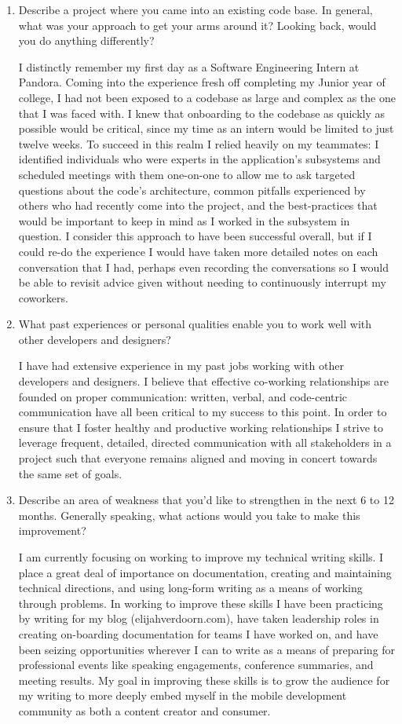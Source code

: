 \documentclass[9pt,letterpaper]{article}
\begin{document}
\begin{enumerate}
	\item Describe a project where you came into an existing code base. In general, what was your approach to get your arms around it? Looking back, would you do anything differently?

		I distinctly remember my first day as a Software Engineering Intern at Pandora. Coming into the experience fresh off completing my Junior year of college, I had not been exposed to a codebase as large and complex as the one that I was faced with. I knew that onboarding to the codebase as quickly as possible would be critical, since my time as an intern would be limited to just twelve weeks. To succeed in this realm I relied heavily on my teammates: I identified individuals who were experts in the application's subsystems and scheduled meetings with them one-on-one to allow me to ask targeted questions about the code's architecture, common pitfalls experienced by others who had recently come into the project, and the best-practices that would be important to keep in mind as I worked in the subsystem in question. I consider this approach to have been successful overall, but if I could re-do the experience I would have taken more detailed notes on each conversation that I had, perhaps even recording the conversations so I would be able to revisit advice given without needing to continuously interrupt my coworkers.

	\item What past experiences or personal qualities enable you to work well with other developers and designers?

		I have had extensive experience in my past jobs working with other developers and designers. I believe that effective co-working relationships are founded on proper communication: written, verbal, and code-centric communication have all been critical to my success to this point. In order to ensure that I foster healthy and productive working relationships I strive to leverage frequent, detailed, directed communication with all stakeholders in a project such that everyone remains aligned and moving in concert towards the same set of goals.

	\item Describe an area of weakness that you'd like to strengthen in the next 6 to 12 months. Generally speaking, what actions would you take to make this improvement?

		I am currently focusing on working to improve my technical writing skills. I place a great deal of importance on documentation, creating and maintaining technical directions, and using long-form writing as a means of working through problems. In working to improve these skills I have been practicing by writing for my blog (elijahverdoorn.com), have taken leadership roles in creating on-boarding documentation for teams I have worked on, and have been seizing opportunities wherever I can to write as a means of preparing for professional events like speaking engagements, conference summaries, and meeting results. My goal in improving these skills is to grow the audience for my writing to more deeply embed myself in the mobile development community as both a content creator and consumer.


\end{enumerate}
\end{document}
